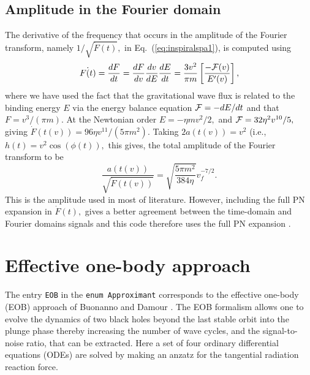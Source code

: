 \subsection{Amplitude in the Fourier domain}
The derivative of the frequency that occurs in the
amplitude of the Fourier transform, namely
$1/\sqrt{\dot{F}(t)},$ in Eq.~(\ref{eq:inspiralspa1}), 
is computed using
\begin{equation}
\dot{F(t)} = \frac{dF}{dt} 
           = \frac{dF}{dv}\frac{dv}{dE}\frac{dE}{dt}
           = \frac{3v^2}{\pi m}\left [\frac{{-\cal F}(v)}{E'(v)} \right ],
\end{equation}
where we have used the fact that the gravitational wave flux
is related to the binding energy $E$ via the energy balance equation
${\cal F} = -dE/dt$ and that $F=v^3/(\pi m).$
At the Newtonian order $E=-\eta m v^2/2,$ and ${\cal F} = 32\eta^2 v^{10}/5,$
giving $\dot{F}(t(v)) = 96\eta v^{11}/(5\pi m^2).$ Taking
$2a(t(v)) = v^2$ (i.e., $h(t) = v^2 \cos (\phi(t)),$ this gives, the 
total amplitude of the Fourier transform to be 
$$\frac{a(t(v))}{\sqrt{\dot{F}(t(v))}} =  \sqrt{\frac{5\pi m^2}{384\eta}} v_f^{-7/2}.$$
This is the amplitude used in most of literature. However, including the
full PN expansion in $\dot{F}(t),$ gives a better agreement between the 
time-domain and Fourier domains signals and this code therefore uses the full
PN expansion \cite{dis2}.

\section{Effective one-body approach}
\newcommand{\ww}{\widehat{\omega}}
\newcommand{\wF}{\widehat{\cal F}}
The entry \texttt{EOB} in the {\tt enum Approximant} corresponds to the 
effective one-body (EOB) approach of Buonanno and Damour 
\cite{BD99,BD00,DJS00,TD02}. The EOB formalism allows one to evolve 
the dynamics of two black holes beyond the last stable orbit into 
the plunge phase thereby increasing the number of
wave cycles, and the signal-to-noise ratio, that can be extracted.
Here a set of four ordinary differential equations (ODEs) are solved 
by making an anzatz for the tangential radiation reaction force. 


